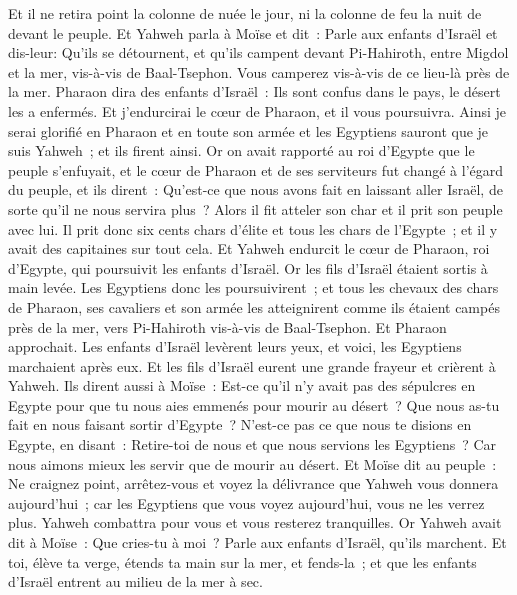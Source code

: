 \begin{multicols}{2}
Et il ne retira point la colonne de nuée le jour, ni la colonne de feu la nuit de devant le peuple.
\VerseOne{}Et Yahweh parla à Moïse et dit~:
Parle aux enfants d'Israël et dis-leur: Qu'ils se détournent, et qu'ils campent devant Pi-Hahiroth, entre Migdol et la mer, vis-à-vis de Baal-Tsephon. Vous camperez vis-à-vis de ce lieu-là près de la mer.
Pharaon dira des enfants d'Israël~: Ils sont confus dans le pays, le désert les a enfermés.
Et j'endurcirai le cœur de Pharaon, et il vous poursuivra. Ainsi je serai glorifié en Pharaon et en toute son armée et les Egyptiens sauront que je suis Yahweh~; et ils firent ainsi.
Or on avait rapporté au roi d'Egypte que le peuple s'enfuyait, et le cœur de Pharaon et de ses serviteurs fut changé à l'égard du peuple, et ils dirent~: Qu'est-ce que nous avons fait en laissant aller Israël, de sorte qu'il ne nous servira plus~?
Alors il fit atteler son char et il prit son peuple avec lui.
Il prit donc six cents chars d'élite et tous les chars de l'Egypte~; et il y avait des capitaines sur tout cela.
Et Yahweh endurcit le cœur de Pharaon, roi d'Egypte, qui poursuivit les enfants d'Israël. Or les fils d'Israël étaient sortis à main levée.
Les Egyptiens donc les poursuivirent~; et tous les chevaux des chars de Pharaon, ses cavaliers et son armée les atteignirent comme ils étaient campés près de la mer, vers Pi-Hahiroth vis-à-vis de Baal-Tsephon.
Et Pharaon approchait. Les enfants d'Israël levèrent leurs yeux, et voici, les Egyptiens marchaient après eux. Et les fils d'Israël eurent une grande frayeur et crièrent à Yahweh.
Ils dirent aussi à Moïse~: Est-ce qu'il n'y avait pas des sépulcres en Egypte pour que tu nous aies emmenés pour mourir au désert~? Que nous as-tu fait en nous faisant sortir d'Egypte~?
N'est-ce pas ce que nous te disions en Egypte, en disant~: Retire-toi de nous et que nous servions les Egyptiens~? Car nous aimons mieux les servir que de mourir au désert.
Et Moïse dit au peuple~: Ne craignez point, arrêtez-vous et voyez la délivrance que Yahweh vous donnera aujourd'hui~; car les Egyptiens que vous voyez aujourd'hui, vous ne les verrez plus.
Yahweh combattra pour vous et vous resterez tranquilles.
Or Yahweh avait dit à Moïse~: Que cries-tu à moi~? Parle aux enfants d'Israël, qu'ils marchent.
Et toi, élève ta verge, étends ta main sur la mer, et fends-la~; et que les enfants d'Israël entrent au milieu de la mer à sec.

\end{multicols}
